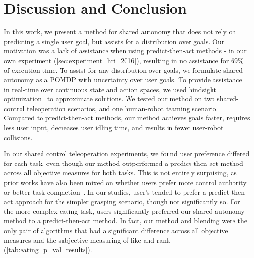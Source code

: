 \section{Discussion and Conclusion}
\label{sec:conclusion}

In this work, we present a method for shared autonomy that does not rely on predicting a single user goal, but assists for a distribution over goals. Our motivation was a lack of assistance when using predict-then-act methods - in our own experiment (\cref{sec:experiment_hri_2016}), resulting in no assistance for $69\%$ of execution time. To assist for any distribution over goals, we formulate shared autonomy as a POMDP with uncertainty over user goals. To provide assistance in real-time over continuous state and action spaces, we used hindsight optimization~\citep{littman_1995,chong_2000,yoon_2008} to approximate solutions. We tested our method on two shared-control teleoperation scenarios, and one human-robot teaming scenario. Compared to predict-then-act methods, our method achieves goals faster, requires less user input, decreases user idling time, and results in fewer user-robot collisions.

In our shared control teleoperation experiments, we found user preference differed for each task, even though our method outperformed a predict-then-act method across all objective measures for both tasks. This is not entirely surprising, as prior works have also been mixed on whether users prefer more control authority or better task completion~\cite{you_2011, kim_2012, dragan_2013_assistive}. In our studies, user's tended to prefer a predict-then-act approach for the simpler grasping scenario, though not significantly so. For the more complex eating task, users significantly preferred our shared autonomy method to a predict-then-act method. In fact, our method and blending were the only pair of algorithms that had a significant difference across all objective measures and the subjective measuring of like and rank (\cref{tab:eating_p_val_results}).

